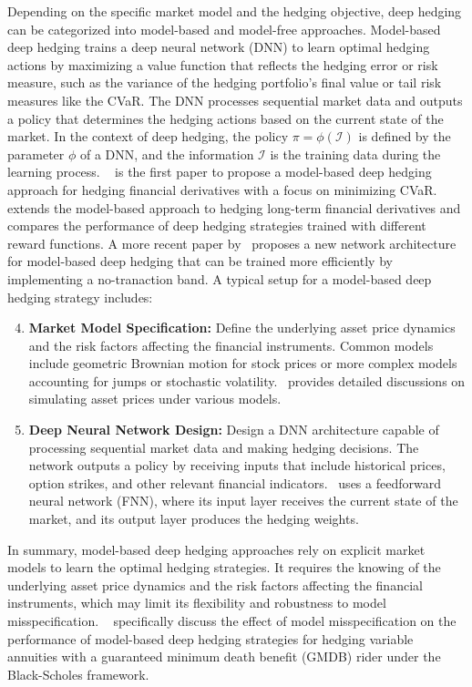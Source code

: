 Depending on the specific market model and the hedging objective, deep hedging can be categorized into model-based and model-free approaches.
Model-based deep hedging trains a deep neural network (DNN) to learn optimal hedging actions by maximizing a value function that reflects the hedging error or risk measure, such as the variance of the hedging portfolio's final value or tail risk measures like the CVaR.
The DNN processes sequential market data and outputs a policy that determines the hedging actions based on the current state of the market.
In the context of deep hedging, the policy $\pi = \phi(\mathcal{I})$ is defined by the parameter $\phi$ of a DNN, and the information $\mathcal{I}$ is the training data during the learning process.
~\cite{buehler2019deep} is the first paper to propose a model-based deep hedging approach for hedging financial derivatives with a focus on minimizing CVaR.
~\cite{carbonneau2021deep} extends the model-based approach to hedging long-term financial derivatives and compares the performance of deep hedging strategies trained with different reward functions.
A more recent paper by~\cite{imaki2021no} proposes a new network architecture for model-based deep hedging that can be trained more efficiently by implementing a no-tranaction band.
A typical setup for a model-based deep hedging strategy includes:

\begin{enumerate}[label=\arabic*a.]
    \setcounter{enumi}{3}
    \item \textbf{Market Model Specification:} Define the underlying asset price dynamics and the risk factors affecting the financial instruments. Common models include geometric Brownian motion for stock prices or more complex models accounting for jumps or stochastic volatility.~\cite{glasserman2004monte} provides detailed discussions on simulating asset prices under various models.
    \item \textbf{Deep Neural Network Design:} Design a DNN architecture capable of processing sequential market data and making hedging decisions. The network outputs a policy by receiving inputs that include historical prices, option strikes, and other relevant financial indicators.~\cite{buehler2019deep} uses a feedforward neural network (FNN), where its input layer receives the current state of the market, and its output layer produces the hedging weights.
\end{enumerate}

In summary, model-based deep hedging approaches rely on explicit market models to learn the optimal hedging strategies.
It requires the knowing of the underlying asset price dynamics and the risk factors affecting the financial instruments, which may limit its flexibility and robustness to model misspecification.
~\cite{chong2023pseudo} specifically discuss the effect of model misspecification on the performance of model-based deep hedging strategies for hedging variable annuities with a guaranteed minimum death benefit (GMDB) rider under the Black-Scholes framework.

